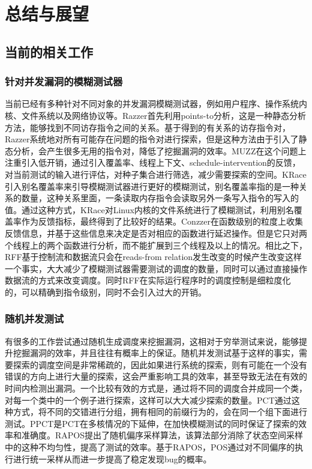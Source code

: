 \section{总结与展望}

\subsection{当前的相关工作}

\subsubsection{针对并发漏洞的模糊测试器}

当前已经有多种针对不同对象的并发漏洞模糊测试器，例如用户程序\cite{chen2020muzz}、操作系统内核\cite{jeong2019razzer}、文件系统\cite{xu2020krace}以及网络协议\cite{pham2020aflnet}等。Razzer首先利用points-to分析，这是一种静态分析方法，能够找到不同访存指令之间的关系。基于得到的有关系的访存指令对，Razzer系统地对所有可能存在问题的指令对进行探索，但是这种方法由于引入了静态分析，会产生很多无用的指令对，降低了挖掘漏洞的效率。MUZZ\cite{chen2020muzz}在这个问题上注重引入低开销，通过引入覆盖率、线程上下文、schedule-intervention的反馈，对当前测试的输入进行评估，对种子集合进行筛选，减少需要探索的空间。KRace引入别名覆盖率来引导模糊测试器进行更好的模糊测试，别名覆盖率指的是一种关系的数量，这种关系里面，一条读取内存指令会读取另外一条写入指令的写入的值。通过这种方式，KRace对Linux内核的文件系统进行了模糊测试，利用别名覆盖率作为反馈指标，最终得到了比较好的结果。Conzzer\cite{jiang2022context}在函数级别的粒度上收集反馈信息，并基于这些信息来决定是否对相应的函数进行延迟操作。但是它只对两个线程上的两个函数进行分析，而不能扩展到三个线程及以上的情况。相比之下，RFF基于控制流和数据流只会在reads-from relation发生改变的时候产生改变这样一个事实，大大减少了模糊测试器需要测试的调度的数量，同时可以通过直接操作数据流的方式来改变调度。同时RFF在实际运行程序时的调度控制是细粒度化的，可以精确到指令级别，同时不会引入过大的开销。

\subsubsection{随机并发测试}

有很多的工作尝试通过随机生成调度来挖掘漏洞，这相对于穷举测试来说，能够提升挖掘漏洞的效率，并且往往有概率上的保证。随机并发测试基于这样的事实，需要探索的调度空间是非常稀疏的，因此如果进行系统的探索，则有可能在一个没有错误的方向上进行大量的探索，这会严重影响工具的效率，甚至导致无法在有效的时间内检测出漏洞。一个比较有效的方式是，通过将不同的调度合并成同一个类，对每一个类中的一个例子进行探索，这样可以大大减少探索的数量。PCT\cite{burckhardt2010randomized}通过这种方式，将不同的交错进行分组，拥有相同的前缀行为的，会在同一个组下面进行测试。PPCT\cite{nagarakatte2012multicore}是PCT在多核情况的下延伸，在加快模糊测试的同时保证了探索的效率和准确度。RAPOS\cite{sen2007effective}提出了随机偏序采样算法，该算法部分消除了状态空间采样中的这种不均匀性，提高了测试的效率。基于RAPOS，POS\cite{yuan2018partial}通过对不同偏序的执行进行统一采样从而进一步提高了稳定发现bug的概率。

